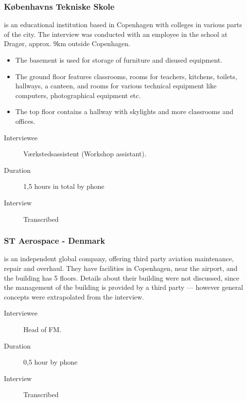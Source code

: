 \subsubsection{K\o benhavns Tekniske Skole} is an educational institution based in Copenhagen with colleges in various parts of the city. The interview was conducted with an employee in the school at Drag\o r, approx. 9km outside Copenhagen.
\begin{itemize}
	\item The basement is used for storage of furniture and disused equipment.
	\item The ground floor features classrooms, rooms for teachers, kitchens, toilets, hallways, a canteen, and rooms for various technical equipment like computers, photographical equipment etc.
	\item The top floor contains a hallway with skylights and more classrooms and offices.
\end{itemize}
\begin{description}
	\item[Interviewee] V\ae rkstedsassistent (Workshop assistant).
	\item[Duration] 1,5 hours in total by phone
	\item[Interview] Transcribed
\end{description}

\subsubsection{ST Aerospace - Denmark} is an independent global company, offering third party aviation maintenance, repair and overhaul. They have facilities in Copenhagen, near the airport, and the building has 5 floors. Details about their building were not discussed, since the management of the building is provided by a third party --- however general concepts were extrapolated from the interview.
\begin{description}
	\item[Interviewee] Head of FM.
	\item[Duration] 0,5 hour by phone
	\item[Interview] Transcribed
\end{description}

